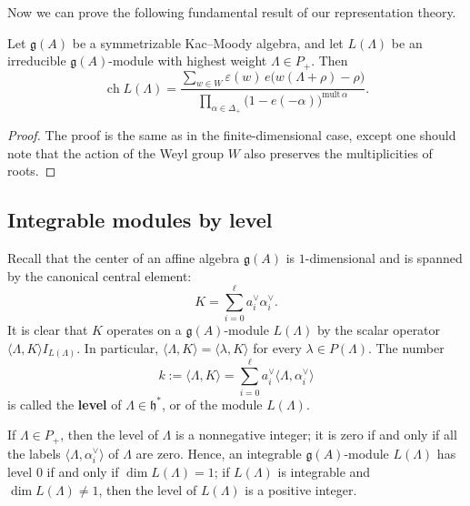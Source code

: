 \documentclass[12pt]{article}
\begin{document}
Now we can prove the following fundamental result of our representation theory.
\begin{theorem}
    Let $\mathfrak{g}(A)$ be a symmetrizable Kac--Moody algebra, and
    let $L(\Lambda)$ be an irreducible $\mathfrak{g}(A)$-module with highest weight
    $\Lambda \in P_+$. Then
    \begin{equation}\label{eq:10.4.1}
        \operatorname{ch} L(\Lambda)
        = \frac{\displaystyle \sum_{w \in W} \varepsilon(w)\, e\bigl(w(\Lambda+\rho)-\rho\bigr)}
        {\displaystyle \prod_{\alpha \in \Delta_+} \bigl(1 - e(-\alpha)\bigr)^{\mathrm{mult}\,\alpha}}.
    \end{equation}
\end{theorem}

\begin{proof}
    The proof is the same as in the finite-dimensional case, except one should note that the action of the Weyl group $W$ also preserves the multiplicities of roots.
\end{proof}

\subsection{Integrable modules by level}

Recall that the center of an affine algebra $\mathfrak{g}(A)$ is $1$-dimensional and is spanned by the canonical central element:
\[
    K = \sum_{i=0}^{\ell} a_i^{\vee} \alpha_i^{\vee}.
\]
It is clear that $K$ operates on a $\mathfrak{g}(A)$-module $L(\Lambda)$ by the scalar operator $\langle \Lambda, K \rangle I_{L(\Lambda)}$. In particular, $\langle \Lambda, K \rangle = \langle \lambda, K \rangle$ for every $\lambda \in P(\Lambda)$. The number
\begin{equation}\label{eq:12.4.1}
    k := \langle \Lambda, K \rangle = \sum_{i=0}^{\ell} a_i^{\vee} \langle \Lambda, \alpha_i^{\vee} \rangle
\end{equation}
is called the \textbf{level} of $\Lambda \in \mathfrak{h}^*$, or of the module $L(\Lambda)$.

If $\Lambda \in P_+$, then the level of $\Lambda$ is a nonnegative integer; it is zero if and only if all the labels $\langle \Lambda, \alpha_i^{\vee} \rangle$ of $\Lambda$ are zero. Hence, an integrable $\mathfrak{g}(A)$-module $L(\Lambda)$ has level $0$ if and only if $\dim L(\Lambda) = 1$; if $L(\Lambda)$ is integrable and $\dim L(\Lambda) \ne 1$, then the level of $L(\Lambda)$ is a positive integer.
\end{document}

